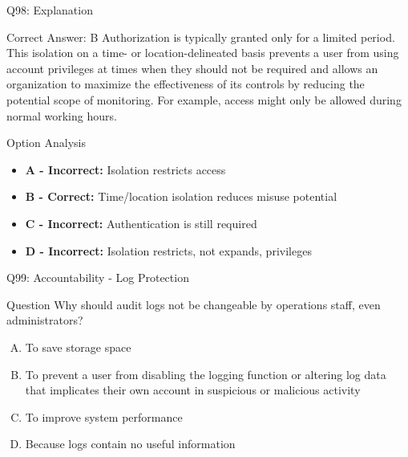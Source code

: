 \documentclass{beamer}
\begin{document}
	\begin{frame}{Q98: Explanation}
		\begin{block}{Correct Answer: B}
			Authorization is typically granted only for a limited period. This isolation on a time- or location-delineated basis prevents a user from using account privileges at times when they should not be required and allows an organization to maximize the effectiveness of its controls by reducing the potential scope of monitoring. For example, access might only be allowed during normal working hours.
		\end{block}
		\begin{block}{Option Analysis}
			\begin{itemize}
				\item \textbf{A - Incorrect:} Isolation restricts access
				\item \textbf{B - Correct:} Time/location isolation reduces misuse potential
				\item \textbf{C - Incorrect:} Authentication is still required
				\item \textbf{D - Incorrect:} Isolation restricts, not expands, privileges
			\end{itemize}
		\end{block}
	\end{frame}
	
	\begin{frame}{Q99: Accountability - Log Protection}
		\begin{block}{Question}
			Why should audit logs not be changeable by operations staff, even administrators?
		\end{block}
		\begin{enumerate}[(A)]
			\item To save storage space
			\item To prevent a user from disabling the logging function or altering log data that implicates their own account in suspicious or malicious activity
			\item To improve system performance
			\item Because logs contain no useful information
		\end{enumerate}
	\end{frame}
	
\end{document}
